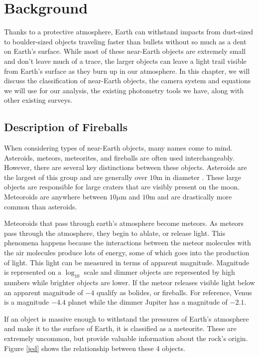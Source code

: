 \chapter{Background}

Thanks to a protective atmosphere, Earth can withstand impacts from dust-sized to boulder-sized objects traveling faster than bullets without so much as a dent on Earth's surface.
While most of these near-Earth objects are extremely small and don't leave much of a trace, the larger objects can leave a light trail visible from Earth's surface as they burn up in our atmosphere.
In this chapter, we will discuss the classification of near-Earth objects, the camera system and equations we will use for our analysis, the existing photometry tools we have, along with other existing surveys.


\section{Description of Fireballs}

When considering types of near-Earth objects, many names come to mind.  
Asteroids, meteors, meteorites, and fireballs are often used interchangeably. 
However, there are several key distinctions between these objects.  
Asteroids are the largest of this group and are generally over $10$m in diameter \cite{meteoroidorbits}. 
These large objects are responsible for large craters that are visibly present on the moon.  
Meteoroids are anywhere between $10 \mu$m and $10$m and are drastically more common than asteroids.  

Meteoroids that pass through earth's atmosphere become meteors.
As meteors pass through the atmosphere, they begin to ablate, or release light.  
This phenomena happens because the interactions between the meteor molecules with the air molecules produce lots of energy, some of which goes into the production of light.
This light can be measured in terms of apparent magnitude.
Magnitude is represented on a $\log_10$ scale and dimmer objects are represented by high numbers while brighter objects are lower.  
If the meteor releases visible light below an apparent magnitude of $-4$ qualify as bolides, or fireballs.
For reference, Venus is a magnitude $-4.4$ planet while the dimmer Jupiter has a magnitude of $-2.1$.


If an object is massive enough to withstand the pressures of Earth's atmosphere and make it to the surface of Earth, it is classified as a meteorite. 
These are extremely uncommon, but provide valuable information about the rock's origin.
Figure \ref{jed} shows the relationship between these 4 objects.

